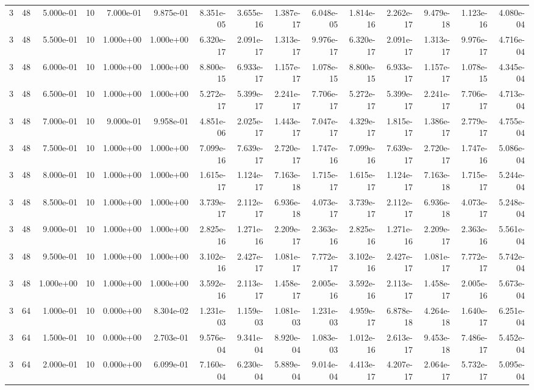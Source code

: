 \begin{tabular}{rrrrrrrrrrrrrrr}
3 & 48 & 5.000e-01 & 10 & 7.000e-01 & 9.875e-01 & 8.351e-05 & 3.655e-16 & 1.387e-17 & 6.048e-05 & 1.814e-16 & 2.262e-17 & 9.479e-18 & 1.123e-16 & 4.080e-04 \\
3 & 48 & 5.500e-01 & 10 & 1.000e+00 & 1.000e+00 & 6.320e-17 & 2.091e-17 & 1.313e-17 & 9.976e-17 & 6.320e-17 & 2.091e-17 & 1.313e-17 & 9.976e-17 & 4.716e-04 \\
3 & 48 & 6.000e-01 & 10 & 1.000e+00 & 1.000e+00 & 8.800e-15 & 6.933e-17 & 1.157e-17 & 1.078e-15 & 8.800e-15 & 6.933e-17 & 1.157e-17 & 1.078e-15 & 4.345e-04 \\
3 & 48 & 6.500e-01 & 10 & 1.000e+00 & 1.000e+00 & 5.272e-17 & 5.399e-17 & 2.241e-17 & 7.706e-17 & 5.272e-17 & 5.399e-17 & 2.241e-17 & 7.706e-17 & 4.713e-04 \\
3 & 48 & 7.000e-01 & 10 & 9.000e-01 & 9.958e-01 & 4.851e-06 & 2.025e-17 & 1.443e-17 & 7.047e-17 & 4.329e-17 & 1.815e-17 & 1.386e-17 & 2.779e-17 & 4.755e-04 \\
3 & 48 & 7.500e-01 & 10 & 1.000e+00 & 1.000e+00 & 7.099e-16 & 7.639e-17 & 2.720e-17 & 1.747e-16 & 7.099e-16 & 7.639e-17 & 2.720e-17 & 1.747e-16 & 5.086e-04 \\
3 & 48 & 8.000e-01 & 10 & 1.000e+00 & 1.000e+00 & 1.615e-17 & 1.124e-17 & 7.163e-18 & 1.715e-17 & 1.615e-17 & 1.124e-17 & 7.163e-18 & 1.715e-17 & 5.244e-04 \\
3 & 48 & 8.500e-01 & 10 & 1.000e+00 & 1.000e+00 & 3.739e-17 & 2.112e-17 & 6.936e-18 & 4.073e-17 & 3.739e-17 & 2.112e-17 & 6.936e-18 & 4.073e-17 & 5.248e-04 \\
3 & 48 & 9.000e-01 & 10 & 1.000e+00 & 1.000e+00 & 2.825e-16 & 1.271e-16 & 2.209e-17 & 2.363e-16 & 2.825e-16 & 1.271e-16 & 2.209e-17 & 2.363e-16 & 5.561e-04 \\
3 & 48 & 9.500e-01 & 10 & 1.000e+00 & 1.000e+00 & 3.102e-16 & 2.427e-17 & 1.081e-17 & 7.772e-17 & 3.102e-16 & 2.427e-17 & 1.081e-17 & 7.772e-17 & 5.742e-04 \\
3 & 48 & 1.000e+00 & 10 & 1.000e+00 & 1.000e+00 & 3.592e-16 & 2.113e-17 & 1.458e-17 & 2.005e-16 & 3.592e-16 & 2.113e-17 & 1.458e-17 & 2.005e-16 & 5.673e-04 \\
3 & 64 & 1.000e-01 & 10 & 0.000e+00 & 8.304e-02 & 1.231e-03 & 1.159e-03 & 1.081e-03 & 1.231e-03 & 4.959e-17 & 6.878e-18 & 4.264e-18 & 1.640e-17 & 6.251e-04 \\
3 & 64 & 1.500e-01 & 10 & 0.000e+00 & 2.703e-01 & 9.576e-04 & 9.341e-04 & 8.920e-04 & 1.083e-03 & 1.012e-16 & 2.613e-17 & 9.453e-18 & 7.486e-17 & 5.452e-04 \\
3 & 64 & 2.000e-01 & 10 & 0.000e+00 & 6.099e-01 & 7.160e-04 & 6.230e-04 & 5.889e-04 & 9.014e-04 & 4.413e-17 & 4.207e-17 & 2.064e-17 & 5.732e-17 & 5.095e-04 \\

\end{tabular}
